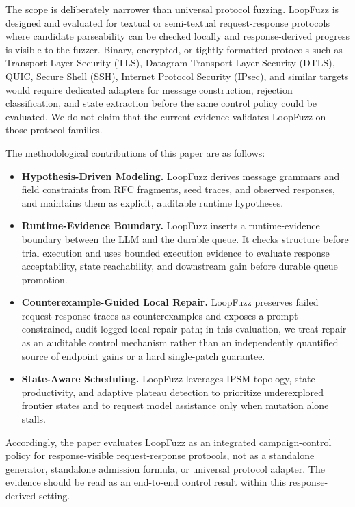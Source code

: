 \documentclass[final,5p,times,number]{elsarticle}
\begin{document}
The scope is deliberately narrower than universal protocol fuzzing. LoopFuzz is designed and evaluated for textual or semi-textual request-response protocols where candidate parseability can be checked locally and response-derived progress is visible to the fuzzer. Binary, encrypted, or tightly formatted protocols such as Transport Layer Security (TLS), Datagram Transport Layer Security (DTLS), QUIC, Secure Shell (SSH), Internet Protocol Security (IPsec), and similar targets would require dedicated adapters for message construction, rejection classification, and state extraction before the same control policy could be evaluated. We do not claim that the current evidence validates LoopFuzz on those protocol families.

The methodological contributions of this paper are as follows:
\begin{itemize}
    \item \textbf{Hypothesis-Driven Modeling.} LoopFuzz derives message grammars and field constraints from RFC fragments, seed traces, and observed responses, and maintains them as explicit, auditable runtime hypotheses.
    \item \textbf{Runtime-Evidence Boundary.} LoopFuzz inserts a runtime-evidence boundary between the LLM and the durable queue. It checks structure before trial execution and uses bounded execution evidence to evaluate response acceptability, state reachability, and downstream gain before durable queue promotion.
    \item \textbf{Counterexample-Guided Local Repair.} LoopFuzz preserves failed request-response traces as counterexamples and exposes a prompt-constrained, audit-logged local repair path; in this evaluation, we treat repair as an auditable control mechanism rather than an independently quantified source of endpoint gains or a hard single-patch guarantee.
    \item \textbf{State-Aware Scheduling.} LoopFuzz leverages IPSM topology, state productivity, and adaptive plateau detection to prioritize underexplored frontier states and to request model assistance only when mutation alone stalls.
\end{itemize}

Accordingly, the paper evaluates LoopFuzz as an integrated campaign-control policy for response-visible request-response protocols, not as a standalone generator, standalone admission formula, or universal protocol adapter. The evidence should be read as an end-to-end control result within this response-derived setting.
\end{document}
